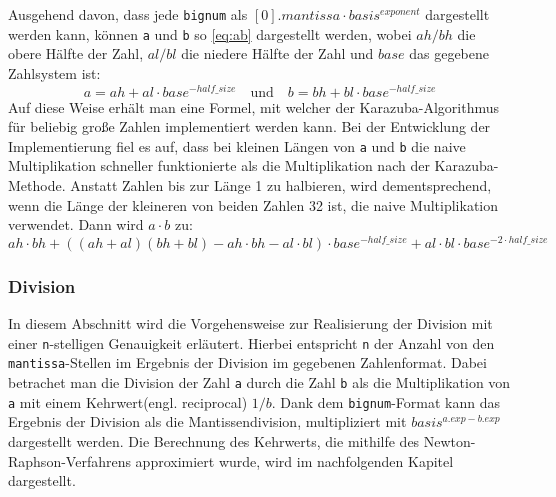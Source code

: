 \documentclass[course=erap]{aspdoc}
\begin{document}
Ausgehend davon, dass jede \texttt{bignum} als $[0].mantissa \cdot basis ^{exponent}$ dargestellt werden kann, können \texttt{a} und \texttt{b} so \ref{eq:ab} dargestellt werden, wobei $ah / bh $ die obere Hälfte der Zahl, $al / bl$ die niedere Hälfte der Zahl und  $base$ das gegebene Zahlsystem ist:
\begin{equation} 
a = ah + al \cdot base ^ {-half\_size} \quad \text{und} \quad
b = bh + bl \cdot base ^ {-half\_size}
\label{eq:ab}
\end{equation}
Auf diese Weise erhält man eine Formel, mit welcher der Karazuba-Algorithmus für beliebig große Zahlen implementiert werden kann. Bei der Entwicklung der Implementierung fiel es auf, dass bei kleinen Längen von \texttt{a} und \texttt{b} die naive Multiplikation schneller funktionierte als die Multiplikation nach der Karazuba-Methode. Anstatt Zahlen bis zur Länge 1 zu halbieren, wird dementsprechend, wenn die Länge der kleineren von beiden Zahlen 32 ist, die naive Multiplikation verwendet.
Dann wird $a \cdot b$  zu: 
\begin{equation} ah \cdot bh + ((ah + al)(bh + bl) - ah \cdot bh - al\cdot bl) \cdot base^{-half\_size} + al \cdot bl\cdot base^{-2 \cdot half\_size} \end{equation}\subsubsection{Division}
In diesem Abschnitt wird die Vorgehensweise zur Realisierung der Division mit einer \texttt{n}-stelligen Genauigkeit erläutert. Hierbei entspricht \texttt{n} der Anzahl von den \texttt{mantissa}-Stellen im Ergebnis der Division im gegebenen Zahlenformat. Dabei betrachet man die Division der Zahl \texttt{a} durch die Zahl \texttt{b} als die Multiplikation von \texttt{a} mit einem Kehrwert(engl. reciprocal) $1/b$. Dank dem \texttt{bignum}-Format kann das Ergebnis der Division als die Mantissendivision, multipliziert mit $basis^{a.exp - b.exp}$ dargestellt werden. Die Berechnung des Kehrwerts, die mithilfe des Newton-Raphson-Verfahrens approximiert wurde, wird im nachfolgenden Kapitel dargestellt.
\end{document}
